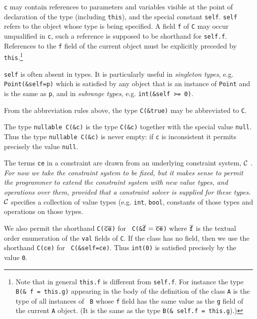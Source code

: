 \documentclass{article}
\begin{document}
{\tt c} may contain references to parameters and variables visible at
the point of declaration of the type (including {\tt this}), and the
special constant {\tt self}.  {\tt self} refers to the object whose
type is being specified. A field {\tt f} of {\tt C} may occur
unqualified in {\tt c}, such a reference is supposed to be shorthand
for {\tt self.f}. References to the {\tt f} field of the current
object must be explicitly preceded by {\tt this}.\footnote{ Note that
in general {\tt this.f} is different from {\tt self.f}.  For instance
the type {\tt B(\& f = this.g)} appearing in the body of the
definition of the class {\tt A} is the type of all instances of {\tt
B} whose {\tt f} field has the same value as the {\tt g} field of the
current {\tt A} object. (It is the same as the type {\tt B(\& self.f =
this.g}).)}

{\tt self} is often absent in types. It is particularly useful in {\em
singleton types}, e.g. {\tt Point(\&self=p)} which is satisfied by any
object that is an instance of {\tt Point} and is the same as {\tt p},
and in {\em subrange types}, e.g. {\tt int(\&self >= 0)}.

From the abbreviation rules above, the type {\tt C(\&true)} may be
abbreviated to {\tt C}.  


The type {\tt nullable C(\&c)} is the type {\tt C(\&c)} together with
the special value {\tt null}. Thus the type {\tt nullable C(\&c)} is
never empty: if {\tt c} is inconsistent it permits precisely the value
{\tt null}.

The terms {\tt ce} in a constraint are drawn from an underlying
constraint system, $\cal C$ \cite{cccc}. {\em For now we take the
constraint system to be fixed, but it makes sense to permit the
programmer to extend the constraint system with new value types, and
operations over them, provided that a constraint solver is supplied
for these types.} $\cal C$ specifies a collection of value types
(e.g.{} {\tt int}, {\tt bool}, constants of those types and operations
on those types. 

We also permit the shorthand {\tt C($\overline{\tt ce}$)} for {\tt
C(\&$\overline{\tt f}=\overline{\tt ce}$)} where $\tt \overline f$ is the textual
order enumeration of the {\tt val} fields of {\tt C}. If the class has
no field, then we use the shorthand {\tt C(ce)} for {\tt
C(\&self=ce)}. Thus {\tt int(0)} is satisfied precisely by the value
{\tt 0}.
\end{document}
